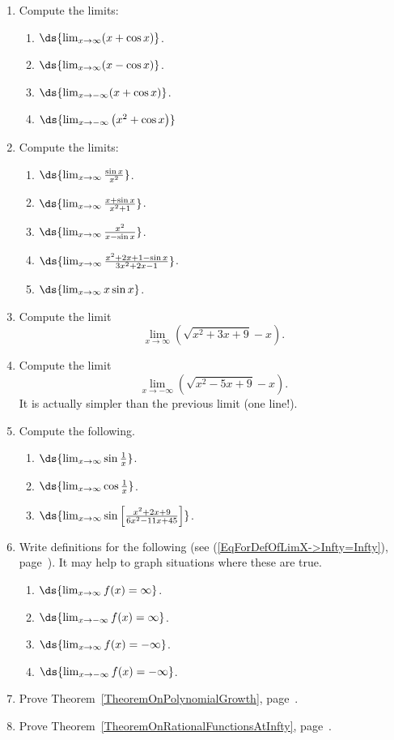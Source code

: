 \begin{multicols}{2}
\begin{enumerate}
\begin{enumerate}
 \end{enumerate}
\item Compute the limits:
 \begin{enumerate}
  \item $\ds{\lim_{x\to\infty}(x+\cos x)}$.
 \item $\ds{\lim_{x\to\infty}(x-\cos x)}$.
 \item $\ds{\lim_{x\to-\infty}(x+\cos x)}$.
\item $\ds{\lim_{x\to-\infty}\left(x^2+\cos x\right)}$
 \end{enumerate}
\item Compute the limits:
 \begin{enumerate}
 \item $\ds{\lim_{x\to\infty}\frac{\sin x}{x^2}}$.
 \item $\ds{\lim_{x\to\infty}\frac{x+\sin x}{x^2+1}}$.
 \item $\ds{\lim_{x\to\infty}\frac{x^2}{x-\sin x}}$.
 \item $\ds{\lim_{x\to\infty}\frac{x^2+2x+1-\sin x}{3x^2+2x-1}}$.
 \item $\ds{\lim_{x\to\infty}x\sin x}$.

 \end{enumerate}

\item Compute the limit 
$$\lim_{x\to\infty}\left(\sqrt{x^2+3x+9}-x
\right).$$  
\item Compute the limit $$\lim_{x\to-\infty}\left(\sqrt{x^2-5x+9}-x
\right).$$ It is actually simpler than the previous limit (one line!).  

\item Compute the following.
\begin{enumerate}
\item $\ds{\lim_{x\to\infty}\sin\frac1x}$.
\item $\ds{\lim_{x\to\infty}\cos\frac1x}$.
\item $\ds{\lim_{x\to\infty}\sin\left[\frac{x^2+2x+9}{6x^2-11x+45}\right]}$.
\end{enumerate}

\item Write  definitions for the following
(see (\ref{EqForDefOfLimX->Infty=Infty}), 
page~\pageref{EqForDefOfLimX->Infty=Infty}).
It may help to graph situations where these are true.
 \begin{enumerate}
 \item $\ds{\lim_{x\to\infty}f(x)=\infty}$.
 \item $\ds{\lim_{x\to-\infty}f(x)=\infty}$.
 \item $\ds{\lim_{x\to\infty}f(x)=-\infty}$.
 \item $\ds{\lim_{x\to-\infty}f(x)=-\infty}$.
 \end{enumerate}
\item Prove Theorem~\ref{TheoremOnPolynomialGrowth}, 
       page~\pageref{TheoremOnPolynomialGrowth}.
\item Prove Theorem~\ref{TheoremOnRationalFunctionsAtInfty},
       page~\pageref{TheoremOnRationalFunctionsAtInfty}.

\end{enumerate}
\end{multicols}
